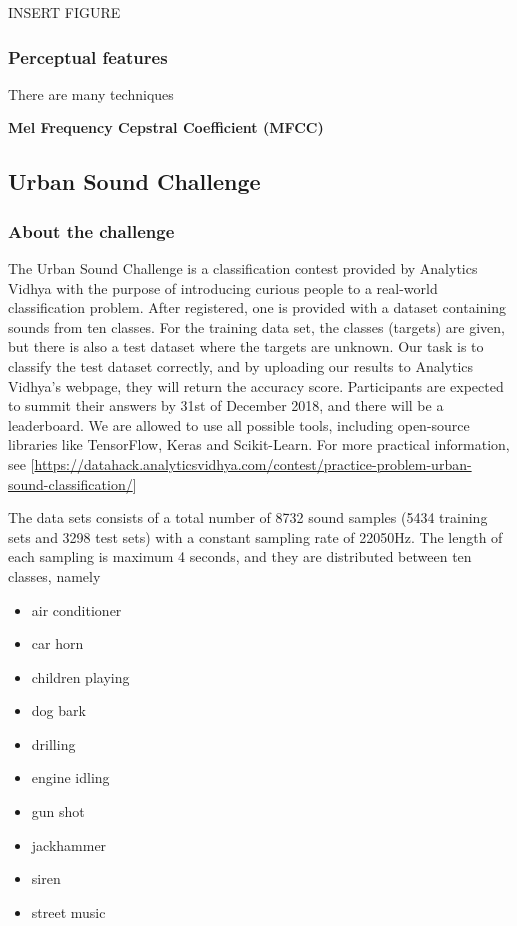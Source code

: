 INSERT FIGURE

\subsubsection{Perceptual features}
There are many techniques 

\textbf{Mel Frequency Cepstral Coefficient (MFCC)}

\subsection{Urban Sound Challenge}
\subsubsection{About the challenge}
The Urban Sound Challenge is a classification contest provided by Analytics Vidhya with the purpose of introducing curious people to a real-world classification problem. After registered, one is provided with a dataset containing sounds from ten classes. For the training data set, the classes (targets) are given, but there is also a test dataset where the targets are unknown. Our task is to classify the test dataset correctly, and by uploading our results to Analytics Vidhya's webpage, they will return the accuracy score. Participants are expected to summit their answers by 31st of December 2018, and there will be a leaderboard. We are allowed to use all possible tools, including open-source libraries like TensorFlow, Keras and Scikit-Learn. For more practical information, see [\url{https://datahack.analyticsvidhya.com/contest/practice-problem-urban-sound-classification/}]

The data sets consists of a total number of 8732 sound samples (5434 training sets and 3298 test sets) with a constant sampling rate of 22050Hz. The length of each sampling is maximum 4 seconds, and they are distributed between ten classes, namely
\begin{multicols}{2}
\begin{itemize}
	\setlength\itemsep{0.2em}
	\item air conditioner
	\item car horn
	\item children playing
	\item dog bark
	\item drilling
\end{itemize}

\columnbreak

\begin{itemize}
	\setlength\itemsep{0.2em}
	\item engine idling
	\item gun shot
	\item jackhammer
	\item siren
	\item street music
\end{itemize}
\end{multicols}

